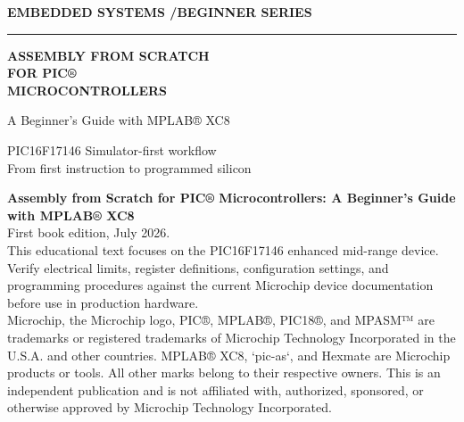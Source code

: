 \begin{titlepage}
\pagecolor{Navy}
\color{white}
\thispagestyle{empty}
\vspace*{0.10\textheight}
{\sffamily\fontsize{14}{18}\selectfont\bfseries\color{white!72} EMBEDDED SYSTEMS \enspace/\enspace BEGINNER SERIES\par}
\vspace{0.9em}
{\color{Teal!75!white}\rule{\textwidth}{2pt}\par}
\vspace{2.2em}
{\sffamily\fontsize{30}{36}\selectfont\bfseries ASSEMBLY FROM SCRATCH\\[0.18em]FOR PIC®\\[0.18em]MICROCONTROLLERS\par}
\vspace{1.5em}
{\sffamily\fontsize{19}{24}\selectfont\color{white!86}A Beginner's Guide with MPLAB® XC8\par}
\vfill
{\sffamily\fontsize{12}{17}\selectfont\color{white!76}
PIC16F17146 \enspace\textbullet\enspace Simulator-first workflow\\
From first instruction to programmed silicon\par}
\vspace{0.08\textheight}
\end{titlepage}
\nopagecolor
\cleardoublepage
\thispagestyle{empty}
\vspace*{0.58\textheight}
{\small\color{Ink}
\textbf{Assembly from Scratch for PIC® Microcontrollers: A Beginner's Guide with MPLAB® XC8}\\
First book edition, July 2026.\\[0.8em]
This educational text focuses on the PIC16F17146 enhanced mid-range device. Verify electrical limits, register definitions, configuration settings, and programming procedures against the current Microchip device documentation before use in production hardware.\\[0.8em]
Microchip, the Microchip logo, PIC®, MPLAB®, PIC18®, and MPASM™ are trademarks or registered trademarks of Microchip Technology Incorporated in the U.S.A. and other countries. MPLAB® XC8, `pic-as`, and Hexmate are Microchip products or tools. All other marks belong to their respective owners. This is an independent publication and is not affiliated with, authorized, sponsored, or otherwise approved by Microchip Technology Incorporated.
\par}
\cleardoublepage
